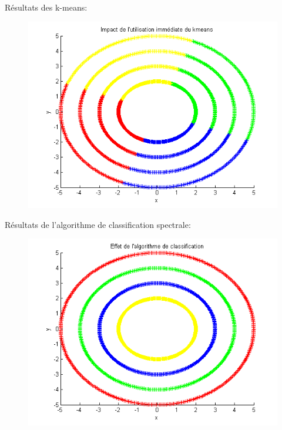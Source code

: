 \documentclass{beamer}
\begin{document}
\begin{frame}

Résultats des k-means:

\begin{figure}
\centering
\includegraphics[scale=0.5,angle=0]{AlgoKmeans.png}
\label{fig:MA} 
\end{figure}

\end{frame}

\begin{frame}

Résultats de l'algorithme de classification spectrale:

\begin{figure}
\centering
\includegraphics[scale=0.5,angle=0]{AlgoClssification.png}
\label{fig:MA} 
\end{figure}

\end{frame}
\end{document}

